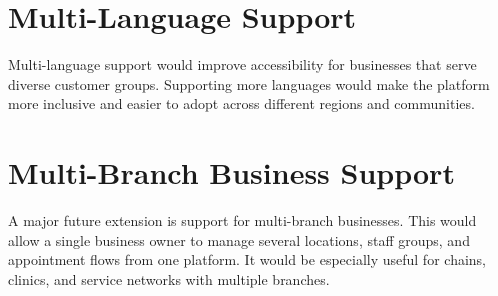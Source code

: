 \section{Multi-Language Support}
Multi-language support would improve accessibility for businesses that serve diverse customer groups. Supporting more languages would make the platform more inclusive and easier to adopt across different regions and communities.

\section{Multi-Branch Business Support}
A major future extension is support for multi-branch businesses. This would allow a single business owner to manage several locations, staff groups, and appointment flows from one platform. It would be especially useful for chains, clinics, and service networks with multiple branches.
